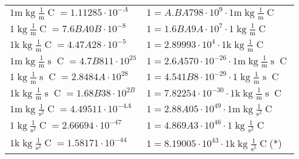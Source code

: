 \begin{center}
\begin{longtable}{l l}
{\color{gray}$1 \bm{\mathrm{ m}}\operatorname{kg}\frac1{\operatorname{m}}{}{\operatorname{C}}{} = 1.11285\cdot10^{-A} $}   & {\color{gray}$ 1 = A.BA798\cdot10^{9} \cdot 1 \bm{\mathrm{ m}}\operatorname{kg}\frac1{\operatorname{m}}{}{\operatorname{C}}{}$}  \\
{\color{black}$1 \bm{\mathrm{ }}\operatorname{kg}\frac1{\operatorname{m}}{}{\operatorname{C}}{} = 7.6BA0B\cdot10^{-8} $}   & {\color{black}$ 1 = 1.6BA9A\cdot10^{7} \cdot 1 \bm{\mathrm{ }}\operatorname{kg}\frac1{\operatorname{m}}{}{\operatorname{C}}{}$}  \\
{\color{gray}$1 \bm{\mathrm{ k}}\operatorname{kg}\frac1{\operatorname{m}}{}{\operatorname{C}}{} = 4.47A28\cdot10^{-5} $}   & {\color{gray}$ 1 = 2.89993\cdot10^{4} \cdot 1 \bm{\mathrm{ k}}\operatorname{kg}\frac1{\operatorname{m}}{}{\operatorname{C}}{}$}  \\
{\color{gray}$1 \bm{\mathrm{ m}}\operatorname{kg}\frac1{\operatorname{m}}{\operatorname{s}}{\operatorname{C}}{} = 4.7B811\cdot10^{25} $}   & {\color{gray}$ 1 = 2.6A570\cdot10^{-26} \cdot 1 \bm{\mathrm{ m}}\operatorname{kg}\frac1{\operatorname{m}}{\operatorname{s}}{\operatorname{C}}{}$}  \\
{\color{black}$1 \bm{\mathrm{ }}\operatorname{kg}\frac1{\operatorname{m}}{\operatorname{s}}{\operatorname{C}}{} = 2.8484A\cdot10^{28} $}   & {\color{black}$ 1 = 4.541B8\cdot10^{-29} \cdot 1 \bm{\mathrm{ }}\operatorname{kg}\frac1{\operatorname{m}}{\operatorname{s}}{\operatorname{C}}{}$}  \\
{\color{gray}$1 \bm{\mathrm{ k}}\operatorname{kg}\frac1{\operatorname{m}}{\operatorname{s}}{\operatorname{C}}{} = 1.68B38\cdot10^{2B} $}   & {\color{gray}$ 1 = 7.82254\cdot10^{-30} \cdot 1 \bm{\mathrm{ k}}\operatorname{kg}\frac1{\operatorname{m}}{\operatorname{s}}{\operatorname{C}}{}$}  \\
{\color{gray}$1 \bm{\mathrm{ m}}\operatorname{kg}{}\frac1{\operatorname{s}^2}{\operatorname{C}}{} = 4.49511\cdot10^{-4A} $}   & {\color{gray}$ 1 = 2.88A05\cdot10^{49} \cdot 1 \bm{\mathrm{ m}}\operatorname{kg}{}\frac1{\operatorname{s}^2}{\operatorname{C}}{}$}  \\
{\color{black}$1 \bm{\mathrm{ }}\operatorname{kg}{}\frac1{\operatorname{s}^2}{\operatorname{C}}{} = 2.66694\cdot10^{-47} $}   & {\color{black}$ 1 = 4.869A3\cdot10^{46} \cdot 1 \bm{\mathrm{ }}\operatorname{kg}{}\frac1{\operatorname{s}^2}{\operatorname{C}}{}$}  \\
{\color{gray}$1 \bm{\mathrm{ k}}\operatorname{kg}{}\frac1{\operatorname{s}^2}{\operatorname{C}}{} = 1.58171\cdot10^{-44} $}   & {\color{gray}$ 1 = 8.19005\cdot10^{43} \cdot 1 \bm{\mathrm{ k}}\operatorname{kg}{}\frac1{\operatorname{s}^2}{\operatorname{C}}{}$}\quad(*)\\

\end{longtable}
\end{center}
